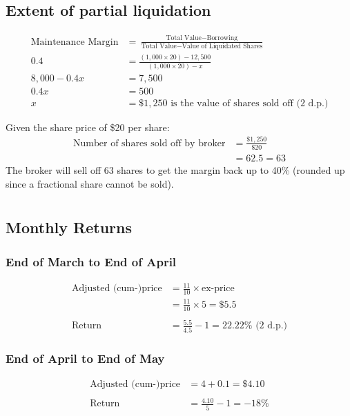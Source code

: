 \documentclass[12pt]{article}
\begin{document}
\subsection{Extent of partial liquidation}
\begin{align*}
	\text{Maintenance Margin} &=  \frac{\text{Total Value} - \text{Borrowing}}{\text{Total Value} - \text{Value of Liquidated Shares}} \\
	0.4 &= \frac{(1,000\times20) - 12,500}{(1,000\times20)-x} \\
	8,000 - 0.4x &= 7,500\\
	0.4x &= 500\\
	x &= \$1,250 \text{ is the value of shares sold off (2 d.p.)}
\end{align*}

Given the share price of \$20 per share:
\begin{align*}
	\text{Number of shares sold off by broker} &= \frac{\$1,250}{\$20}\\
	&= 62.5 = 63
\end{align*}
The broker will sell off 63 shares to get the margin back up to 40\% (rounded up since a fractional share cannot be sold).

\newpage
\section{}
\subsection{Monthly Returns}
\subsubsection{End of March to End of April}
\begin{align*}
	\text{Adjusted (cum-)price} &= \frac{11}{10}\times\text{ex-price}\\
	&= \frac{11}{10}\times5 = \$5.5\\
	&\\
	\text{Return} &= \frac{5.5}{4.5}-1 = 22.22\% \text{  (2 d.p.)}
\end{align*}

\subsubsection{End of April to End of May}
\begin{align*}
	\text{Adjusted (cum-)price} &= 4 + 0.1 = \$4.10\\
	&\\
	\text{Return} &= \frac{4.10}{5}-1 = -18\%
\end{align*}
\end{document}
